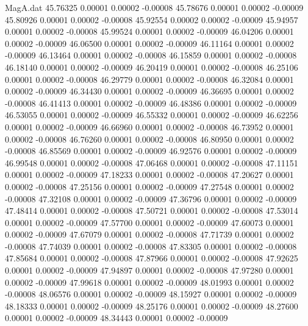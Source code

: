 \begin{filecontents}{MagA.dat}
  45.76325    0.00001    0.00002   -0.00008
  45.78676    0.00001    0.00002   -0.00009
  45.80926    0.00001    0.00002   -0.00008
  45.92554    0.00002    0.00002   -0.00009
  45.94957    0.00001    0.00002   -0.00008
  45.99524    0.00001    0.00002   -0.00009
  46.04206    0.00001    0.00002   -0.00009
  46.06500    0.00001    0.00002   -0.00009
  46.11164    0.00001    0.00002   -0.00009
  46.13464    0.00001    0.00002   -0.00008
  46.15859    0.00001    0.00002   -0.00008
  46.18140    0.00001    0.00002   -0.00009
  46.20419    0.00001    0.00002   -0.00008
  46.25106    0.00001    0.00002   -0.00008
  46.29779    0.00001    0.00002   -0.00008
  46.32084    0.00001    0.00002   -0.00009
  46.34430    0.00001    0.00002   -0.00009
  46.36695    0.00001    0.00002   -0.00008
  46.41413    0.00001    0.00002   -0.00009
  46.48386    0.00001    0.00002   -0.00009
  46.53055    0.00001    0.00002   -0.00009
  46.55332    0.00001    0.00002   -0.00009
  46.62256    0.00001    0.00002   -0.00009
  46.66960    0.00001    0.00002   -0.00008
  46.73952    0.00001    0.00002   -0.00008
  46.76260    0.00001    0.00002   -0.00008
  46.80950    0.00001    0.00002   -0.00008
  46.85569    0.00001    0.00002   -0.00009
  46.92576    0.00001    0.00002   -0.00009
  46.99548    0.00001    0.00002   -0.00008
  47.06468    0.00001    0.00002   -0.00008
  47.11151    0.00001    0.00002   -0.00009
  47.18233    0.00001    0.00002   -0.00008
  47.20627    0.00001    0.00002   -0.00008
  47.25156    0.00001    0.00002   -0.00009
  47.27548    0.00001    0.00002   -0.00008
  47.32108    0.00001    0.00002   -0.00009
  47.36796    0.00001    0.00002   -0.00009
  47.48414    0.00001    0.00002   -0.00008
  47.50721    0.00001    0.00002   -0.00008
  47.53014    0.00001    0.00002   -0.00009
  47.57700    0.00001    0.00002   -0.00009
  47.60073    0.00001    0.00002   -0.00009
  47.67079    0.00001    0.00002   -0.00008
  47.71739    0.00001    0.00002   -0.00008
  47.74039    0.00001    0.00002   -0.00008
  47.83305    0.00001    0.00002   -0.00008
  47.85684    0.00001    0.00002   -0.00008
  47.87966    0.00001    0.00002   -0.00008
  47.92625    0.00001    0.00002   -0.00009
  47.94897    0.00001    0.00002   -0.00008
  47.97280    0.00001    0.00002   -0.00009
  47.99618    0.00001    0.00002   -0.00009
  48.01993    0.00001    0.00002   -0.00008
  48.06576    0.00001    0.00002   -0.00009
  48.15927    0.00001    0.00002   -0.00009
  48.18333    0.00001    0.00002   -0.00009
  48.25176    0.00001    0.00002   -0.00009
  48.27600    0.00001    0.00002   -0.00009
  48.34443    0.00001    0.00002   -0.00009

\end{filecontents}
